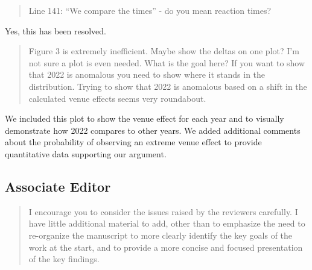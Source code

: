 \documentclass[12pt]{article}
\newenvironment{comment}%
{\begin{quotation}\noindent\small\it\color{darkblue}\ignorespaces%
}{\end{quotation}}
\begin{document}
\begin{comment}
Line 141: “We compare the times” - do you mean reaction times?
\end{comment}

Yes, this has been resolved.

\begin{comment}
Figure 3 is extremely inefficient. Maybe show the deltas on one plot? I'm not
sure a plot is even needed. What is the goal here? If you want to show that 2022
is anomalous you need to show where it stands in the distribution. Trying to
show that 2022 is anomalous based on a shift in the calculated venue effects
seems very roundabout.
\end{comment}

We included this plot to show the venue effect for each year and to visually
demonstrate how 2022 compares to other years.  We added additional comments
about the probability of observing an extreme venue effect to provide
quantitative data supporting our argument.



\subsection*{Associate Editor}
\begin{comment}
I encourage you to consider the issues raised by the reviewers carefully. I have
little additional material to add, other than to emphasize the need to
re-organize the manuscript to more clearly identify the key goals of the work at
the start, and to provide a more concise and focused presentation of the key
findings.
\end{comment}

%
%
\end{document}
